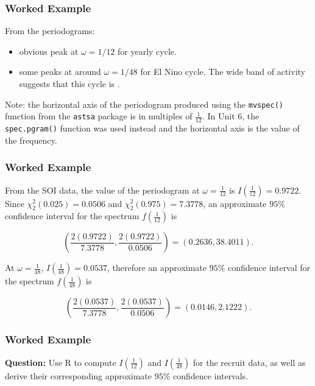 \documentclass[%
xcolor=pdftex]{beamer}
\begin{document}
\begin{frame} [fragile]
\frametitle{Worked Example}

From the periodograms:

\begin{itemize}
\item obvious peak at $\omega = 1/12$ for yearly cycle.
\item some peaks at around $\omega = 1/48$ for El Nino cycle. The wide band of activity suggests that this cycle is \underline{\hspace{30 mm}}.
\end{itemize}

Note: the horizontal axis of the periodogram produced using the \verb=mvspec()= function from the \verb=astsa= package is in multiples of $\frac{1}{12}$. In Unit 6, the \verb=spec.pgram()= function was used instead and the horizontal axis is the value of the frequency.

\end{frame}

\begin{frame}
\frametitle{Worked Example}

From the SOI data, the value of the periodogram at $\omega = \frac{1}{12}$ is $I(\frac{1}{12}) = 0.9722$. Since $\chi_2^2(0.025) = 0.0506$ and $\chi_2^2(0.975) = 7.3778$, an approximate $95\%$ confidence interval for the spectrum $f(\frac{1}{12})$ is

$$
\left(\frac{2(0.9722)}{7.3778}, \frac{2(0.9722)}{0.0506}\right) = (0.2636, 38.4011).
$$

At $\omega = \frac{1}{48}$, $I(\frac{1}{48}) = 0.0537$, therefore an approximate $95\%$ confidence interval for the spectrum $f(\frac{1}{48})$ is

$$
\left(\frac{2(0.0537)}{7.3778}, \frac{2(0.0537)}{0.0506}\right) = (0.0146, 2.1222).
$$
\end{frame}

\begin{frame}
\frametitle{Worked Example}

\textbf{Question:} Use R to compute $I(\frac{1}{12})$ and $I(\frac{1}{48})$ for the recruit data, as well as derive their corresponding approximate $95\%$ confidence intervals.

\vspace{50mm}

\end{frame}
\end{document}
